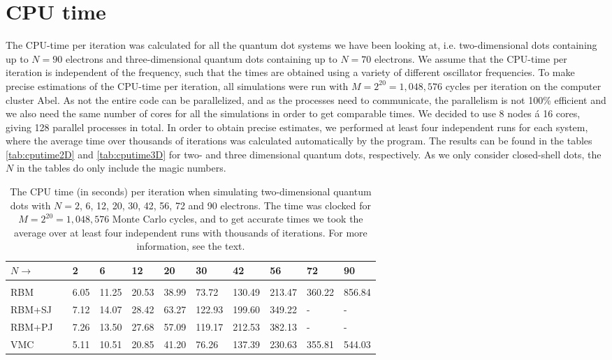 \section{CPU time} \label{sec:cputime}
The CPU-time per iteration was calculated for all the quantum dot systems we have been looking at, i.e. two-dimensional dots containing up to $N=90$ electrons and three-dimensional quantum dots containing up to $N=70$ electrons. We assume that the CPU-time per iteration is independent of the frequency, such that the times are obtained using a variety of different oscillator frequencies. To make precise estimations of the CPU-time per iteration, all simulations were run with $M=2^{20}=1,048,576$ cycles per iteration on the computer cluster Abel. As not the entire code can be parallelized, and as the processes need to communicate, the parallelism is not 100\% efficient and we also need the same number of cores for all the simulations in order to get comparable times. We decided to use 8 nodes á 16 cores, giving 128 parallel processes in total. In order to obtain precise estimates, we performed at least four independent runs for each system, where the average time over thousands of iterations was calculated automatically by the program. The results can be found in the tables \eqref{tab:cputime2D} and \eqref{tab:cputime3D} for two- and three dimensional quantum dots, respectively. As we only consider closed-shell dots, the $N$ in the tables do only include the magic numbers.

\begin{table}[H]
	\caption{The CPU time (in seconds) per iteration when simulating two-dimensional quantum dots with $N=2$, 6, 12, 20, 30, 42, 56, 72 and 90 electrons. The time was clocked for $M=2^{20}=1,048,576$ Monte Carlo cycles, and to get accurate times we took the average over at least four independent runs with thousands of iterations. For more information, see the text.}
	\label{tab:cputime2D}
	\begin{tabularx}{\textwidth}{lR{0.3cm}R{0.9cm}R{1.1cm}R{1.1cm}R{1.1cm}R{1.1cm}R{1.1cm}R{1.1cm}R{1.1cm}R{1.1cm}} \hline\hline
		$N\rightarrow$ & \makecell{\\ \phantom{=}} & 2 & 6 & 12 & 20 & 30 & 42 & 56 & 72 & 90 \\ \hline \\
		RBM && 6.05 & 11.25 & 20.53 & 38.99 & 73.72 & 130.49 & 213.47 & 360.22 & 856.84 \\
		RBM+SJ && 7.12 & 14.07 & 28.42 & 63.27 & 122.93 & 199.60 & 349.22 & - & - \\
		RBM+PJ && 7.26 & 13.50 & 27.68 & 57.09 & 119.17 & 212.53 & 382.13 & - & - \\
		VMC && 5.11 & 10.51 & 20.85 & 41.20 & 76.26 & 137.39 & 230.63 & 355.81 & 544.03 \\ \hline \hline
	\end{tabularx}
\end{table}

